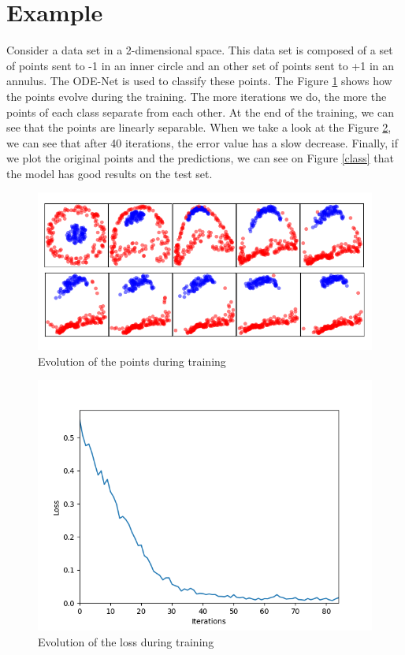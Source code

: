 \documentclass[10pt,a4paper]{article}
\theoremstyle{definition}
\theoremstyle{definition}
\theoremstyle{definition}
\begin{document}
\newpage
\section{Example}

Consider a data set in a 2-dimensional space. This data set is composed of a set of points sent to -1 in an inner circle and an other set of points sent to +1 in an annulus. The ODE-Net is used to classify these points. The Figure \ref{evol} shows how the points evolve during the training. The more iterations we do, the more the points of each class separate from each other. At the end of the training, we can see that the points are linearly separable. When we take a look at the Figure \ref{loss}, we can see that after 40 iterations, the error value has a slow decrease. Finally, if we plot the original points and the predictions, we can see on Figure \ref{class} that the model has good results on the test set.

\begin{figure}[!h]
\center
\includegraphics[scale=0.6]{evol_spheres.png}
\caption{Evolution of the points during training}
\label{evol}
\end{figure}

\begin{figure}[!h]
\center
\includegraphics[scale=0.65]{loss_spheres.png}
\caption{Evolution of the loss during training}
\label{loss}
\end{figure}
\end{document}
